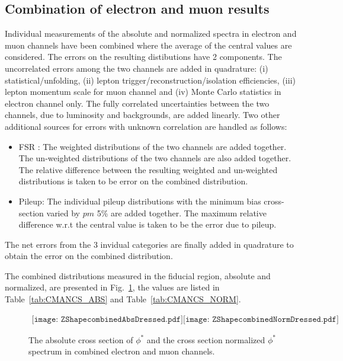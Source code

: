 

\subsection*{Combination of electron and muon results}
Individual measurements of the absolute  and normalized  spectra in electron and muon channels have been combined where the average of the central values  are considered.  The errors on the resulting distibutions have 2 components. The uncorrelated errors among the two channels are added in quadrature: (i) statistical/unfolding, (ii) lepton trigger/reconstruction/isolation efficiencies, (iii) lepton momentum scale for muon channel and (iv) Monte Carlo statistics  in electron channel only. The fully correlated uncertainties between the two channels, due to luminosity and backgrounds, are added linearly. 
 Two other additional sources for errors with unknown correlation are handled as follows:
\begin{itemize}
\item FSR : The weighted distributions of the two channels are added together. The un-weighted distributions
of the two channels are also added together. The relative difference between the resulting weighted and un-weighted
distributions is taken to be error on the combined distribution.
\item Pileup: The individual pileup distributions with the minimum bias cross-section varied  by $pm$ 5\% are added together. The maximum relative difference 
w.r.t the central value is taken to be the error due to pileup.
\end{itemize}

The net errors from the 3 invidual categories are finally added in quadrature to obtain the error on the combined distribution.

The combined \phistar distributions measured in the fiducial region, absolute and normalized, are presented in Fig.~\ref{fig:CMANCS}, the values are listed in Table~\ref{tab:CMANCS_ABS} and Table~\ref{tab:CMANCS_NORM}. 
\begin{figure}[htp]
\begin{center}$ 
\begin{array}{cc}
\texttt{[image: ZShapecombinedAbsDressed.pdf]}
\texttt{[image: ZShapecombinedNormDressed.pdf]}
\end{array}$
\caption{The absolute cross section of $\phi^{*}$ and the cross section normalized $\phi^{*}$ spectrum in combined electron and muon channels.}
\label{fig:CMANCS}
\end{center}
\end{figure}

